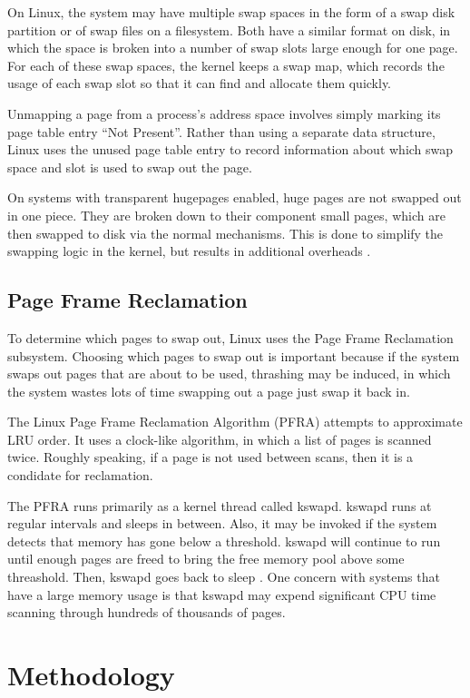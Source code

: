 \documentclass[twocolumn,11pt]{article}
\begin{document}
On Linux, the system may have multiple swap spaces in the form of a swap disk
partition or of swap files on a filesystem. Both have a similar format on disk,
in which the space is broken into a number of swap slots large enough for one
page. For each of these swap spaces, the kernel keeps a swap map, which records
the usage of each swap slot so that it can find and allocate them quickly.

Unmapping a page from a process's address space involves simply marking its page
table entry ``Not Present''. Rather than using a separate data structure, Linux
uses the unused page table entry to record information about which swap space
and slot is used to swap out the page.

On systems with transparent hugepages enabled, huge pages are not swapped out in
one piece.  They are broken down to their component small pages, which are then
swapped to disk via the normal mechanisms. This is done to simplify the swapping
logic in the kernel, but results in additional overheads
\cite{corbet_transparent}.

\subsection{Page Frame Reclamation}

To determine which pages to swap out, Linux uses the Page Frame Reclamation
subsystem. Choosing which pages to swap out is important because if the system
swaps out pages that are about to be used, thrashing may be induced, in which
the system wastes lots of time swapping out a page just swap it back in.

The Linux Page Frame Reclamation Algorithm (PFRA) attempts to approximate LRU
order. It uses a clock-like algorithm, in which a list of pages is scanned
twice. Roughly speaking, if a page is not used between scans, then it is a
condidate for reclamation.

The PFRA runs primarily as a kernel thread called kswapd. kswapd runs at regular
intervals and sleeps in between. Also, it may be invoked if the system detects
that memory has gone below a threshold. kswapd will continue to run until enough
pages are freed to bring the free memory pool above some threashold. Then,
kswapd goes back to sleep \cite{utlk}.  One concern with systems that have a large memory
usage is that kswapd may expend significant CPU time scanning through hundreds
of thousands of pages.

\section{Methodology}
\end{document}
